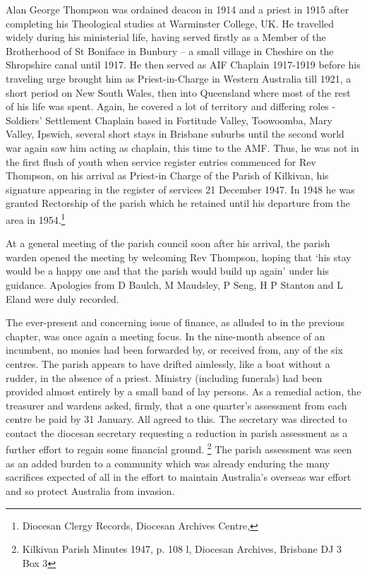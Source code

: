 Alan George Thompson was ordained deacon in 1914 and a priest in 1915
after completing his Theological studies at Warminster College, UK. He
travelled widely during his ministerial life, having served firstly as a
Member of the Brotherhood of St Boniface in Bunbury -- a small village
in Cheshire on the Shropshire canal until 1917. He then served as AIF
Chaplain 1917-1919 before his traveling urge brought him as
Priest-in-Charge in Western Australia till 1921, a short period on New
South Wales, then into Queensland where most of the rest of his life was
spent. Again, he covered a lot of territory and differing roles -
Soldiers' Settlement Chaplain based in Fortitude Valley, Toowoomba, Mary
Valley, Ipswich, several short stays in Brisbane suburbs until the
second world war again saw him acting as chaplain, this time to the AMF.
Thus, he was not in the first flush of youth when service register
entries commenced for Rev Thompson, on his arrival as Priest-in Charge
of the Parish of Kilkivan, his signature appearing in the register of
services 21 December 1947. In 1948 he was granted Rectorship of the
parish which he retained until his departure from the area in
1954.\footnote{Diocesan Clergy Records, Diocesan Archives Centre,}

At a general meeting of the parish council soon after his arrival, the
parish warden opened the meeting by welcoming Rev Thompson, hoping that
`his stay would be a happy one and that the parish would build up again'
under his guidance. Apologies from D Baulch, M Maudsley, P Seng, H P
Stanton and L Eland were duly recorded.

The ever-present and concerning issue of finance, as alluded to in the
previous chapter, was once again a meeting focus. In the nine-month
absence of an incumbent, no monies had been forwarded by, or received
from, any of the six centres. The parish appears to have drifted
aimlessly, like a boat without a rudder, in the absence of a priest.
Ministry (including funerals) had been provided almost entirely by a
small band of lay persons. As a remedial action, the treasurer and
wardens asked, firmly, that a one quarter's assessment from each centre
be paid by 31 January. All agreed to this. The secretary was directed to
contact the diocesan secretary requesting a reduction in parish
assessment as a further effort to regain some financial ground.
\footnote{Kilkivan Parish Minutes 1947, p. 108 l, Diocesan Archives,
  Brisbane DJ 3 Box 3} The parish assessment was seen as an added burden
to a community which was already enduring the many sacrifices expected
of all in the effort to maintain Australia's overseas war effort and so
protect Australia from invasion.


